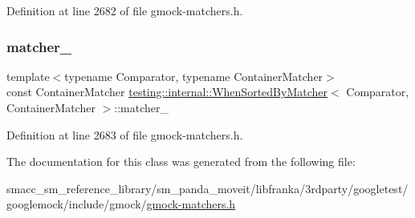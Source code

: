 Definition at line 2682 of file gmock-\/matchers.\+h.

\mbox{\label{classtesting_1_1internal_1_1WhenSortedByMatcher_ab873ba633a5f7dfc46440e8f2c9d5611}} 
\subsubsection{\texorpdfstring{matcher\+\_\+}{matcher\_}}
{\footnotesize\ttfamily template$<$typename Comparator, typename Container\+Matcher$>$ \\
const Container\+Matcher \hyperlink{classtesting_1_1internal_1_1WhenSortedByMatcher}{testing\+::internal\+::\+When\+Sorted\+By\+Matcher}$<$ Comparator, Container\+Matcher $>$\+::matcher\+\_\+\hspace{0.3cm}{\ttfamily [private]}}



Definition at line 2683 of file gmock-\/matchers.\+h.



The documentation for this class was generated from the following file\+:\begin{DoxyCompactItemize}
\item 
smacc\+\_\+sm\+\_\+reference\+\_\+library/sm\+\_\+panda\+\_\+moveit/libfranka/3rdparty/googletest/googlemock/include/gmock/\hyperlink{gmock-matchers_8h}{gmock-\/matchers.\+h}\end{DoxyCompactItemize}
